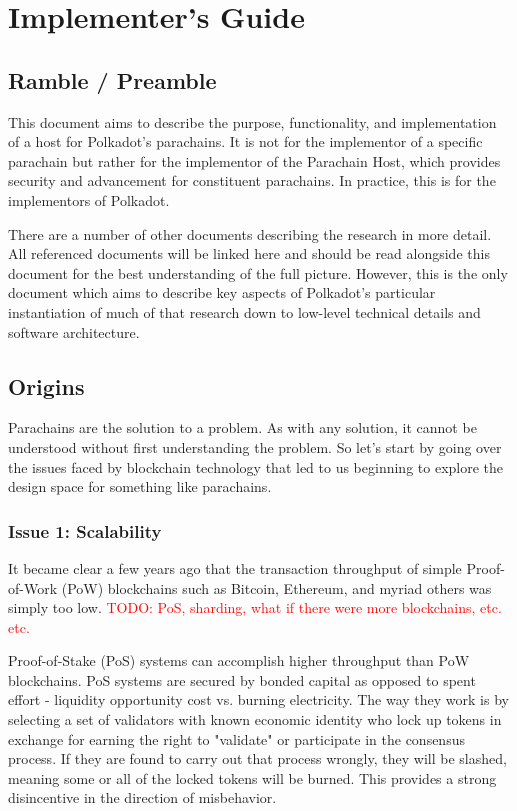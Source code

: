\newcommand{\todo}[1]{\textcolor{red}{TODO: #1}}

\chapter{Implementer's Guide}

\section{Ramble / Preamble}

This document aims to describe the purpose, functionality, and implementation of
a host for Polkadot's parachains. It is not for the implementor of a specific
parachain but rather for the implementor of the Parachain Host, which provides
security and advancement for constituent parachains. In practice, this is for
the implementors of Polkadot.
\newline

There are a number of other documents describing the research in more detail.
All referenced documents will be linked here and should be read alongside this
document for the best understanding of the full picture. However, this is the
only document which aims to describe key aspects of Polkadot's particular
instantiation of much of that research down to low-level technical details and
software architecture.

\section{Origins}

Parachains are the solution to a problem. As with any solution, it cannot be
understood without first understanding the problem. So let's start by going over
the issues faced by blockchain technology that led to us beginning to explore
the design space for something like parachains.

\subsection{Issue 1: Scalability}

It became clear a few years ago that the transaction throughput of simple
Proof-of-Work (PoW) blockchains such as Bitcoin, Ethereum, and myriad others was
simply too low. \todo{PoS, sharding, what if there were more blockchains, etc.
etc.}
\newline

Proof-of-Stake (PoS) systems can accomplish higher throughput than PoW
blockchains. PoS systems are secured by bonded capital as opposed to spent
effort - liquidity opportunity cost vs. burning electricity. The way they work
is by selecting a set of validators with known economic identity who lock up
tokens in exchange for earning the right to "validate" or participate in the
consensus process. If they are found to carry out that process wrongly, they
will be slashed, meaning some or all of the locked tokens will be burned. This
provides a strong disincentive in the direction of misbehavior.
\newline


